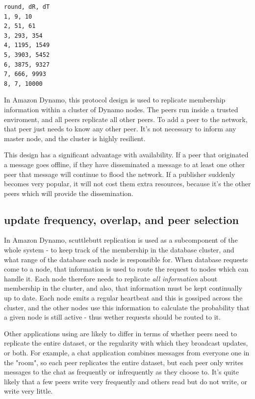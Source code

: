 \documentclass[sigconf]{acmart}
\begin{document}
\begin{verbatim}
round, dR, dT
1, 9, 10
2, 51, 61
3, 293, 354
4, 1195, 1549
5, 3903, 5452
6, 3875, 9327
7, 666, 9993
8, 7, 10000
\end{verbatim}

In Amazon Dynamo, this protocol design is used to replicate membership
information within a cluster of Dynamo nodes.  The peers run inside a
trusted enviroment, and all peers replicate all other peers. To add a
peer to the network, that peer just needs to know any other peer. It's
not necessary to inform any master node, and the cluster is highly
resilient.

This design has a significant advantage with availability.  If a peer
that originated a message goes offline, if they have disseminated a
message to at least one other peer that message will continue to flood
the network. If a publisher suddenly becomes very popular, it will not
cost them extra resources, because it's the other peers which will
provide the dissemination.

\subsection{update frequency, overlap, and peer selection}

In Amazon Dynamo, scuttlebutt replication is used as a subcomponent of
the whole system - to keep track of the membership in the database
cluster, and what range of the database each node is responsible
for. When database requests come to a node, that information is used
to route the request to nodes which can handle it. Each node therefore
needs to replicate {\em all information} about membership in the
cluster, and also, that information must be kept continually up to
date. Each node emits a regular heartbeat and this is gossiped across
the cluster, and the other nodes use this information to calculate the
probability that a given node is still active - thus wether requests
should be routed to it.

Other applications using are likely to differ in terms of whether
peers need to replicate the entire dataset, or the regularity with
which they broadcast updates, or both. For example, a chat application
combines messages from everyone one in the "room", so each peer
replicates the entire dataset, but each peer only writes messages to
the chat as frequently or infrequently as they choose to. It's quite
likely that a few peers write very frequently and others read but do
not write, or write very little.
\end{document}
